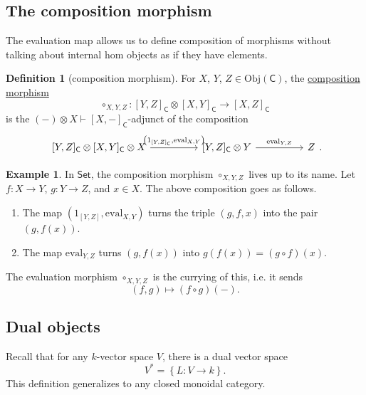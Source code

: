 \documentclass[a4paper,10pt]{scrreprt}
\newcommand{\defn}[1]{\ul{#1}}
\newcommand{\Obj}{\mathrm{Obj}}
\newcommand{\ev}{\mathrm{eval}}
\theoremstyle{definition}
\newtheorem{definition}{Definition}[section]
\newtheorem{example}{Example}[section]
\theoremstyle{plain}
\theoremstyle{remark}
\begin{document}
\subsection{The composition morphism}
The evaluation map allows us to define composition of morphisms without talking about internal hom objects as if they have elements. 
\begin{definition}[composition morphism]
  \label{def:compositionmorphism}
  For $X$, $Y$, $Z \in \Obj(\mathsf{C})$, the \defn{composition morphism}
  \begin{equation*}
    \circ_{X, Y, Z}\colon [Y, Z]_{\mathsf{C}} \otimes [X, Y]_{\mathsf{C}} \to [X, Z]_{\mathsf{C}}
  \end{equation*}
  is the $(-) \otimes X \vdash [X, -]_{\mathsf{C}}$-adjunct of the composition
  \begin{equation*}
    \begin{tikzcd}[column sep=huge]
      {[Y, Z]_{\mathsf{C}}} \otimes {[X, Y]_{\mathsf{C}}} \otimes X 
      \arrow[r, "{\left(1_{[Y, Z]_{\mathsf{C}}}, \ev_{X, Y}\right)}"]
      & {[Y, Z]_{\mathsf{C}}} \otimes Y
      \arrow[r, "{\ev_{Y, Z}}"]
      & Z
    \end{tikzcd}.
  \end{equation*}
\end{definition}

\begin{example}
  In $\mathsf{Set}$, the composition morphism $\circ_{X, Y, Z}$ lives up to its name. Let $f\colon X \to Y$, $g\colon Y \to Z$, and $x \in X$. The above composition goes as follows.
  \begin{enumerate}
    \item The map $\left( 1_{[Y, Z]}, \ev_{X, Y} \right)$ turns the triple $(g, f, x)$ into the pair $(g, f(x))$.

    \item The map $\ev_{Y, Z}$ turns $(g, f(x))$ into $g(f(x)) = (g \circ f)(x)$.
  \end{enumerate}

  The evaluation morphism $\circ_{X, Y, Z}$ is the currying of this, i.e. it sends
  \begin{equation*}
    (f, g) \mapsto (f \circ g)(-).
  \end{equation*}
\end{example}

\subsection{Dual objects}
Recall that for any $k$-vector space $V$, there is a dual vector space 
\begin{equation*}
  V^{*} = \left\{ L\colon V \to k \right\}.
\end{equation*}
This definition generalizes to any closed monoidal category.
\end{document}
